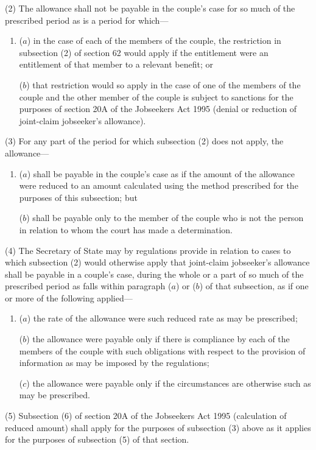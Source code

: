 \documentclass[12pt,a4paper]{article}
\begin{document}
(2) The allowance shall not be payable in the couple’s case for so much of the prescribed period as is a period for which—
\begin{enumerate}\item[]
($a$) in the case of each of the members of the couple, the restriction in subsection (2)  of section 62 would apply if the entitlement were an entitlement of that member to a relevant benefit; or

($b$) that restriction would so apply in the case of one of the members of the couple and the other member of the couple is subject to sanctions for the purposes of section 20A of the Jobseekers Act 1995 (denial or reduction of joint-claim jobseeker’s allowance).
\end{enumerate}

(3) For any part of the period for which subsection (2)  does not apply, the allowance—
\begin{enumerate}\item[]
($a$) shall be payable in the couple’s case as if the amount of the allowance were reduced to an amount calculated using the method prescribed for the purposes of this subsection; but

($b$) shall be payable only to the member of the couple who is not the person in relation to whom the court has made a determination.
\end{enumerate}

(4) The Secretary of State may by regulations provide in relation to cases to which subsection (2)  would otherwise apply that joint-claim jobseeker’s allowance shall be payable in a couple’s case, during the whole or a part of so much of the prescribed period as falls within paragraph ($a$)  or ($b$)  of that subsection, as if one or more of the following applied—
\begin{enumerate}\item[]
($a$) the rate of the allowance were such reduced rate as may be prescribed;

($b$) the allowance were payable only if there is compliance by each of the members of the couple with such obligations with respect to the provision of information as may be imposed by the regulations;

($c$) the allowance were payable only if the circumstances are otherwise such as may be prescribed.
\end{enumerate}

(5) Subsection (6)  of section 20A of the Jobseekers Act 1995 (calculation of reduced amount) shall apply for the purposes of subsection (3)  above as it applies for the purposes of subsection (5)  of that section.
\end{document}
